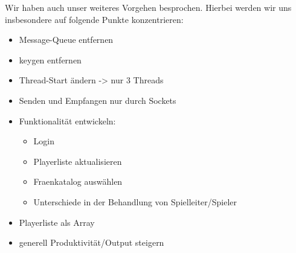 \documentclass[a4paper,10pt]{article}
\begin{document}
Wir haben auch unser weiteres Vorgehen besprochen. Hierbei werden wir uns insbesondere auf folgende Punkte konzentrieren:\\
\begin{itemize}
 \item Message-Queue entfernen
 \item keygen entfernen
 \item Thread-Start ändern -> nur 3 Threads
 \item Senden und Empfangen nur durch Sockets
 \item Funktionalität entwickeln:
      \begin{itemize}
       \item Login
       \item Playerliste aktualisieren
       \item Fraenkatalog auswählen
       \item Unterschiede in der Behandlung von Spielleiter/Spieler
      \end{itemize}

 \item Playerliste als Array
 \item generell Produktivität/Output steigern
\end{itemize}
\end{document}
